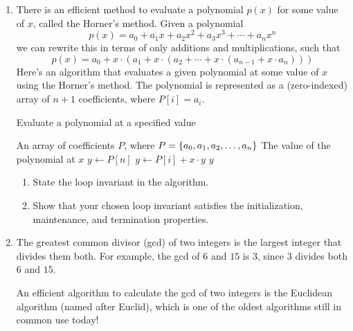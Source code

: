 \begin{exercises}
\begin{enumerate}
        \item There is an efficient method to evaluate a polynomial $p\left(x\right)$ for some value of $x$, called the Horner's method. Given a polynomial
            \[
                p\left(x\right) = a_0 + a_1 x + a_2 x^2 + a_3 x^3 + \cdots + a_n x^n
            \]
        we can rewrite this in terms of only additions and multiplications, such that
        \[
            p\left(x\right) = a_0 + x\cdot\left(a_1 + x\cdot\left(a_2 + \cdots + x\cdot\left(a_{n-1} + x\cdot a_n\right)\right)\right)
        \]
        Here's an algorithm that evaluates a given polynomial at some value of $x$ using the Horner's method. The polynomial is represented as a (zero-indexed) array of $n+1$ coefficients, where $P[i] = a_i$.
        \begin{algorithm}[H]
            \caption{Evaluate a polynomial at a specified value}
            \begin{algorithmic}[1]
                \Require An array of coefficients $P$, where $P = \left\{a_0, a_1, a_2, \ldots, a_n\right\}$
                \Ensure The value of the polynomial at $x$
                    \State $y \gets P[n]$
                        \State $y \gets P[i] + x\cdot y$
                    \EndFor
                    \Return $y$
                \EndFunction
            \end{algorithmic}
        \end{algorithm}

        \begin{enumerate}
            \item State the loop invariant in the algorithm.
            \item Show that your chosen loop invariant satisfies the initialization, maintenance, and termination properties.
        \end{enumerate}

    \item[\challenge] The greatest common divisor (gcd) of two integers is the largest integer that divides them both. For example, the gcd of $6$ and $15$ is $3$, since $3$ divides both $6$ and $15$.

        An efficient algorithm to calculate the gcd of two integers is the Euclidean algorithm (named after Euclid), which is one of the oldest algorithms still in common use today! 


\end{enumerate}
\end{exercises}
